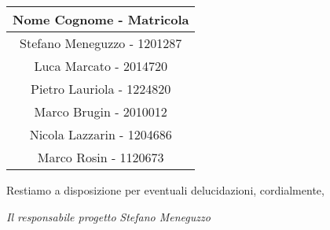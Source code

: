     \begin{center}
        \begin{tabular}{c}
            \textbf{Nome Cognome - Matricola} \\
            \hline\hline
            Stefano Meneguzzo - 1201287 \\
            Luca Marcato - 2014720 \\
            Pietro Lauriola - 1224820 \\
            Marco Brugin - 2010012 \\
            Nicola Lazzarin - 1204686 \\
            Marco Rosin - 1120673 \\

        \end{tabular}
    \end{center}
\vspace{20pt}
Restiamo a disposizione per eventuali delucidazioni, \newline
cordialmente,

\vspace{10pt}

\mbox{}\hfill \textit{Il responsabile progetto} \newline
\mbox{}\hfill \textit{Stefano Meneguzzo}
    